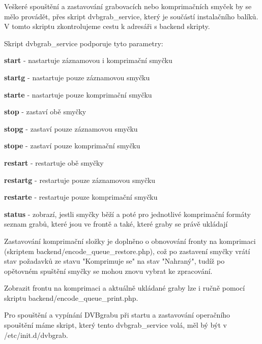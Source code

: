 \vspace{10pt}

Veškeré spouštění a zastavování grabovacích nebo komprimačních smyček by se mělo provádět, přes skript dvbgrab\_service, který je součástí instalačního balíků. V tomto skriptu zkontrolujeme cestu k adresáři s backend skripty.

\vspace{10pt}

Skript dvbgrab\_service podporuje tyto parametry:

\vspace{10pt}

\textbf{start} - nastartuje záznamovou i komprimační smyčku

\textbf{startg} - nastartuje pouze záznamovou smyčku

\textbf{starte} - nastartuje pouze komprimační smyčku

\textbf{stop} - zastaví obě smyčky

\textbf{stopg} - zastaví pouze záznamovou smyčku

\textbf{stope} - zastaví pouze komprimační smyčku

\textbf{restart} - restartuje obě smyčky

\textbf{restartg} - restartuje pouze záznamovou smyčku

\textbf{restarte} - restartuje pouze komprimační smyčku

\textbf{status} - zobrazí, jestli smyčky běží a poté pro jednotlivé komprimační formáty seznam grabů, které jsou ve frontě a také, které graby se právě ukládají

\vspace{10pt}

Zastavování komprimační složky je doplněno o obnovování fronty na komprimaci (skriptem backend/encode\_queue\_restore.php), což po zastavení smyčky vrátí stav požadavků ze stavu "Komprimuje se" na stav "Nahraný", tudíž po opětovném spuštění smyčky se mohou znovu vybrat ke zpracování.

\vspace{10pt}

Zobrazit frontu na komprimaci a aktuálně ukládané graby lze i ručně pomocí skriptu backend/encode\_queue\_print.php.

\vspace{10pt}

Pro spouštění a vypínání DVBgrabu při startu a zastavování operačního spouštění máme skript, který tento dvbgrab\_service volá, měl bý být v /etc/init.d/dvbgrab.
